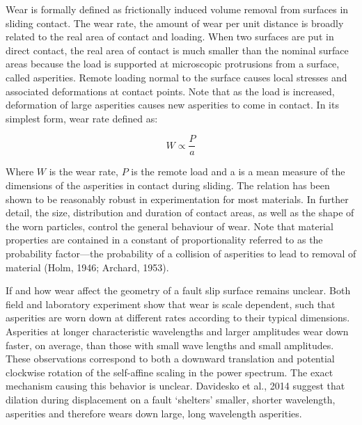 \documentclass[12pt,a4paper]{article}
\begin{document}
Wear is formally defined as frictionally induced volume removal from surfaces in sliding contact. The wear rate, the amount of wear per unit distance is broadly related to the real area of contact and loading. When two surfaces are put in direct contact, the real area of contact is much smaller than the nominal surface areas because the load is supported at microscopic protrusions from a surface, called asperities. Remote loading normal to the surface causes local stresses and associated deformations at contact points. Note that as the load is increased, deformation of large asperities causes new asperities to come in contact. In its simplest form, wear rate defined as:

\begin{equation}
W \varpropto \dfrac{P}{a}
\end{equation}

Where $W$ is the wear rate, $P$ is the remote load and a is a mean measure of the dimensions of the asperities in contact during sliding. The relation has been shown to be reasonably robust in experimentation for most materials. In further detail, the size, distribution and duration of contact areas, as well as the shape of the worn particles, control the general behaviour of wear. Note that material properties are contained in a constant of proportionality referred to as the probability factor—the probability of a collision of asperities to lead to removal of material (Holm, 1946; Archard, 1953).

If and how wear affect the geometry of a fault slip surface remains unclear. Both field and laboratory experiment show that wear is scale dependent, such that asperities are worn down at different rates according to their typical dimensions. Asperities at longer characteristic wavelengths and larger amplitudes wear down faster, on average, than those with small wave lengths and small amplitudes. These observations correspond to both a downward translation and potential clockwise rotation of the self-affine scaling in the power spectrum. The exact mechanism causing this behavior is unclear. Davidesko et al., 2014 suggest that dilation during displacement on a fault ‘shelters’ smaller, shorter wavelength, asperities and therefore wears down large, long wavelength asperities.
\end{document}
